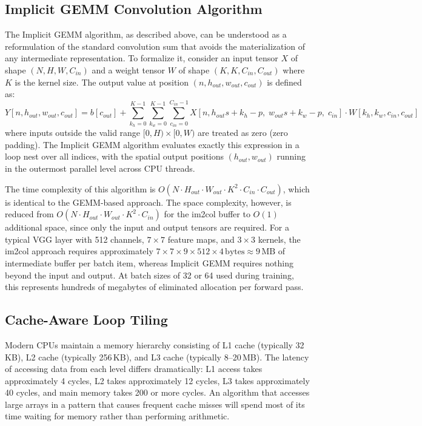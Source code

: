 \documentclass[12pt,oneside,a4paper]{report}
\begin{document}
\subsection{Implicit GEMM Convolution Algorithm}

The Implicit GEMM algorithm, as described above, can be understood as a reformulation of the standard convolution sum that avoids the materialization of any intermediate representation. To formalize it, consider an input tensor $X$ of shape $(N, H, W, C_{in})$ and a weight tensor $W$ of shape $(K, K, C_{in}, C_{out})$ where $K$ is the kernel size. The output value at position $(n, h_{out}, w_{out}, c_{out})$ is defined as:
$$Y[n, h_{out}, w_{out}, c_{out}] = b[c_{out}] + \sum_{k_h=0}^{K-1} \sum_{k_w=0}^{K-1} \sum_{c_{in}=0}^{C_{in}-1} X[n, h_{out} s + k_h - p,\; w_{out} s + k_w - p,\; c_{in}] \cdot W[k_h, k_w, c_{in}, c_{out}]$$
where inputs outside the valid range $[0, H) \times [0, W)$ are treated as zero (zero padding). The Implicit GEMM algorithm evaluates exactly this expression in a loop nest over all indices, with the spatial output positions $(h_{out}, w_{out})$ running in the outermost parallel level across CPU threads.

The time complexity of this algorithm is $O(N \cdot H_{out} \cdot W_{out} \cdot K^2 \cdot C_{in} \cdot C_{out})$, which is identical to the GEMM-based approach. The space complexity, however, is reduced from $O(N \cdot H_{out} \cdot W_{out} \cdot K^2 \cdot C_{in})$ for the im2col buffer to $O(1)$ additional space, since only the input and output tensors are required. For a typical VGG layer with 512 channels, $7 \times 7$ feature maps, and $3 \times 3$ kernels, the im2col approach requires approximately $7 \times 7 \times 9 \times 512 \times 4\,\text{bytes} \approx 9\,\text{MB}$ of intermediate buffer per batch item, whereas Implicit GEMM requires nothing beyond the input and output. At batch sizes of 32 or 64 used during training, this represents hundreds of megabytes of eliminated allocation per forward pass.

\subsection{Cache-Aware Loop Tiling}

Modern CPUs maintain a memory hierarchy consisting of L1 cache (typically 32\,KB), L2 cache (typically 256\,KB), and L3 cache (typically 8--20\,MB). The latency of accessing data from each level differs dramatically: L1 access takes approximately 4 cycles, L2 takes approximately 12 cycles, L3 takes approximately 40 cycles, and main memory takes 200 or more cycles. An algorithm that accesses large arrays in a pattern that causes frequent cache misses will spend most of its time waiting for memory rather than performing arithmetic.
\end{document}
